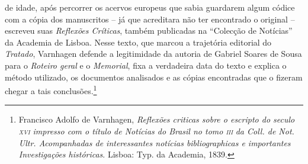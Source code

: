 de idade, após percorrer os acervos europeus que sabia guardarem algum
códice com a cópia dos manuscritos – já que acreditara não ter
encontrado o original – escreveu suas \textit{Reflexões Críticas},		
também publicadas na ``Colecção de Notícias'' da Academia de Lisboa.
Nesse texto, que marcou a trajetória editorial do \textit{Tratado},
Varnhagen defende a legitimidade da autoria de Gabriel Soares de Sousa
para o \textit{Roteiro geral} e o \textit{Memorial}, fixa a verdadeira
data do texto e explica o método utilizado, os documentos analisados e
as cópias encontradas que o fizeram chegar a tais conclusões.\footnote{
Francisco Adolfo de Varnhagen, \textit{Reflexões criticas sobre o
escripto do seculo \textsc{xvi} impresso com o título de Notícias do Brasil no
tomo \textsc{iii}}\textit{\textsuperscript{} }\textit{da Coll. de Not. Ultr.
Acompanhadas de interessantes notícias bibliographicas e importantes
Investigações históricas}. Lisboa: Typ. da Academia, 1839.}  

